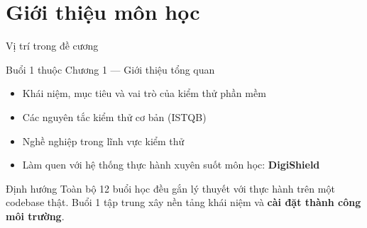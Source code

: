 \documentclass[aspectratio=169,12pt]{beamer}
\begin{document}
\section{Giới thiệu môn học}

\begin{frame}{Vị trí trong đề cương}
  \begin{block}{Buổi 1 thuộc Chương 1 --- Giới thiệu tổng quan}
    \begin{itemize}
      \item Khái niệm, mục tiêu và vai trò của kiểm thử phần mềm
      \item Các nguyên tắc kiểm thử cơ bản (ISTQB)
      \item Nghề nghiệp trong lĩnh vực kiểm thử
      \item Làm quen với hệ thống thực hành xuyên suốt môn học: \textbf{DigiShield}
    \end{itemize}
  \end{block}

  \vspace{0.4em}
  \begin{exampleblock}{Định hướng}
    Toàn bộ 12 buổi học đều gắn lý thuyết với thực hành trên một codebase thật.
    Buổi 1 tập trung xây nền tảng khái niệm và \textbf{cài đặt thành công môi trường}.
  \end{exampleblock}
\end{frame}
\end{document}

